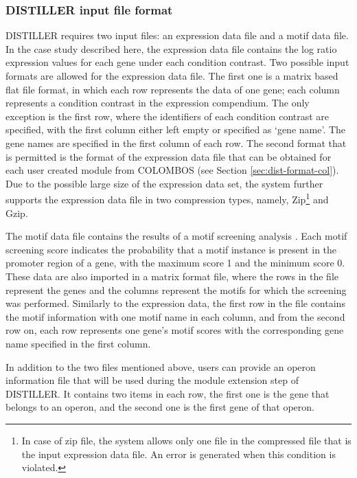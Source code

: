 \subsubsection{DISTILLER input file format}\label{sec:distiller-infile-format}
DISTILLER requires two input files: an expression data file and a motif data 
file. In the case study described here, the expression data file contains the 
log ratio expression values for each gene under each condition contrast. Two 
possible input formats are allowed for the expression data file. 
The first one is a matrix based flat file format, in which each row represents 
the data of one gene; each column represents a condition contrast in the 
expression compendium. 
The only exception is the first row, where the identifiers of each condition 
contrast are specified, with the first column either left empty or specified 
as `gene name'.  
The gene names are specified in the first column of each row.  
The second format that is permitted is the format of the expression data file 
that can be obtained for each user created module from COLOMBOS (see Section 
\ref{sec:dist-format-col}).
Due to the possible large size of the expression data set, the system further 
supports the expression data file in two compression types, namely, 
Zip\footnote{In case of zip file, the 
system allows only one file in the compressed file that is the input expression 
data file. An error is generated when this condition is violated.} and Gzip.


The motif data file contains the results of a motif screening analysis 
\cite{Hertzberg2005}. 
Each motif screening score indicates the probability that a motif instance is 
present in the promoter region of a gene, with the maximum score 1 and the 
minimum score 0. These data are also imported in a matrix format file, where 
the rows in the file represent the genes and the columns represent the motifs 
for which the screening was performed. Similarly to the expression data, the 
first row in the file contains the motif information with one motif name in 
each column, and from the second row on, each row represents one gene's motif 
scores with the corresponding gene name specified in the first column.

In addition to the two files mentioned above, users can provide an operon 
information file that will be used during the module extension step of 
DISTILLER. It contains two items in each row, the first one is the gene that 
belongs to an operon, and the second one is the first gene of that operon.

